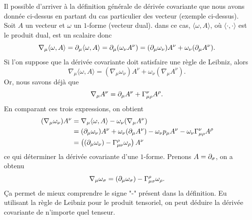 \documentclass[a4paper,11pt]{report}
\begin{document}
                \begin{rmk}
                    Il possible d'arriver à la définition générale de dérivée covariante que nous avons donnée ci-dessus en partant du cas particulier des vecteur (exemple ci-dessus).
                    Soit $A$ un vecteur et $\omega$ un $1$-forme (vecteur dual). dans ce cas, $\langle\omega,A\rangle$, où $\langle\cdot,\cdot\rangle$ est le produit dual, est un scalaire donc
                    \begin{equation}
                        \nabla_\mu\langle\omega,A\rangle = \partial_\mu\langle\omega,A\rangle = \partial_\mu (\omega_\nu A^\nu) = (\partial_\mu \omega_\nu)A^\nu+\omega_\nu(\partial_\mu A^\nu).
                    \end{equation}
                    Si l'on suppose que la dérivée covariante doit satisfaire une règle de Leibniz, alors
                    \begin{equation}
                        \nabla_\mu\langle\omega,A\rangle = (\nabla_\mu \omega_\nu)A^\nu+\omega_\nu(\nabla_\mu A^\nu).
                    \end{equation}
                    Or, nous savons déjà que
                    \begin{equation}
                        \nabla_\mu A^\nu = \partial_\mu A^\nu+\Gamma^\nu_{\mu\rho}A^\rho.
                    \end{equation}
                    En comparant ces trois expressions, on obtient
                    \begin{align}
                        (\nabla_\mu \omega_\nu)A^\nu &= \nabla_\mu\langle\omega,A\rangle-\omega_\nu(\nabla_\mu A^\nu) \\
                        &= (\partial_\mu \omega_\nu)A^\nu+\omega_\nu(\partial_\mu A^\nu) - \omega_\nu p_\mu A^\nu-\omega_\nu\Gamma^\nu_{\mu\rho}A^\rho \\
                        &= \left((\partial_\mu \omega_\nu)-\Gamma^\rho_{\mu\nu}\omega_\rho\right) A^\nu\\
                    \end{align}
                    ce qui déterminer la dérivée covariante d'une $1$-forme. Prenons $A = \partial_\sigma$, on a obtenu
                    \begin{equation}
                        \nabla_\mu \omega_\sigma = (\partial_\mu \omega_\sigma)-\Gamma^\rho_{\mu\sigma}\omega_\rho.
                    \end{equation}
                    Ça permet de mieux comprendre le signe "-" présent dans la définition. Eu utilisant la règle de Leibniz pour le produit tensoriel, on peut déduire la dérivée covariante de n'importe quel tenseur.
                \end{rmk}
                
\end{document}
